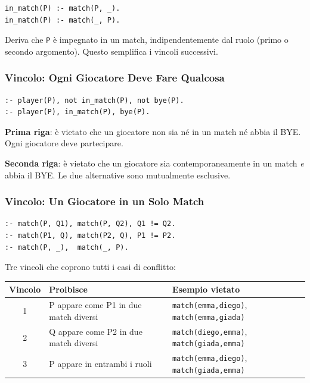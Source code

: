 \documentclass[12pt,a4paper]{article}
\begin{document}
\begin{lstlisting}
in_match(P) :- match(P, _).
in_match(P) :- match(_, P).
\end{lstlisting}

Deriva che \texttt{P} è impegnato in un match, indipendentemente dal ruolo
(primo o secondo argomento). Questo semplifica i vincoli successivi.

\subsubsection{Vincolo: Ogni Giocatore Deve Fare Qualcosa}

\begin{lstlisting}
:- player(P), not in_match(P), not bye(P).
:- player(P), in_match(P), bye(P).
\end{lstlisting}

\textbf{Prima riga}: è vietato che un giocatore non sia né in un match né abbia
il BYE. Ogni giocatore deve partecipare.

\textbf{Seconda riga}: è vietato che un giocatore sia contemporaneamente in un
match \emph{e} abbia il BYE. Le due alternative sono mutualmente esclusive.

\subsubsection{Vincolo: Un Giocatore in un Solo Match}

\begin{lstlisting}
:- match(P, Q1), match(P, Q2), Q1 != Q2.
:- match(P1, Q), match(P2, Q), P1 != P2.
:- match(P, _),  match(_, P).
\end{lstlisting}

Tre vincoli che coprono tutti i casi di conflitto:

\begin{center}
\renewcommand{\arraystretch}{1.3}
\begin{tabular}{cp{6.5cm}p{6cm}}
\toprule
\textbf{Vincolo} & \textbf{Proibisce} & \textbf{Esempio vietato} \\
\midrule
1 & P appare come P1 in due match diversi & \texttt{match(emma,diego)}, \texttt{match(emma,giada)} \\
2 & Q appare come P2 in due match diversi & \texttt{match(diego,emma)}, \texttt{match(giada,emma)} \\
3 & P appare in entrambi i ruoli & \texttt{match(emma,diego)}, \texttt{match(giada,emma)} \\
\bottomrule
\end{tabular}
\end{center}
\end{document}
